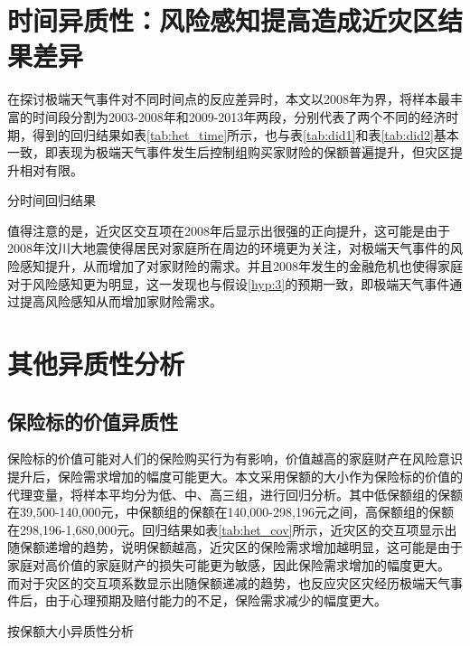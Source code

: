 \section{时间异质性：风险感知提高造成近灾区结果差异}

在探讨极端天气事件对不同时间点的反应差异时，本文以2008年为界，将样本最丰富的时间段分割为2003-2008年和2009-2013年两段，分别代表了两个不同的经济时期，得到的回归结果如表\ref{tab:het_time}所示，也与表\ref{tab:did1}和表\ref{tab:did2}基本一致，即表现为极端天气事件发生后控制组购买家财险的保额普遍提升，但灾区提升相对有限。

\begin{table}[ht]
    \centering
    \renewcommand{\arraystretch}{1}
    \caption{分时间回归结果}\label{tab:het_time}
    
\end{table}

值得注意的是，近灾区交互项在2008年后显示出很强的正向提升，这可能是由于2008年汶川大地震使得居民对家庭所在周边的环境更为关注，对极端天气事件的风险感知提升，从而增加了对家财险的需求。并且2008年发生的金融危机也使得家庭对于风险感知更为明显，这一发现也与假设\ref{hyp:3}的预期一致，即极端天气事件通过提高风险感知从而增加家财险需求。

\section{其他异质性分析}
\subsection{保险标的价值异质性}
保险标的价值可能对人们的保险购买行为有影响，价值越高的家庭财产在风险意识提升后，保险需求增加的幅度可能更大。本文采用保额的大小作为保险标的价值的代理变量，将样本平均分为低、中、高三组，进行回归分析。其中低保额组的保额在39,500-140,000元，中保额组的保额在140,000-298,196元之间，高保额组的保额在298,196-1,680,000元。回归结果如表\ref{tab:het_cov}所示，近灾区的交互项显示出随保额递增的趋势，说明保额越高，近灾区的保险需求增加越明显，这可能是由于家庭对高价值的家庭财产的损失可能更为敏感，因此保险需求增加的幅度更大。
而对于灾区的交互项系数显示出随保额递减的趋势，也反应灾区灾经历极端天气事件后，由于心理预期及赔付能力的不足，保险需求减少的幅度更大。
\begin{table}
    \centering
    \caption{按保额大小异质性分析}\label{tab:het_cov}
    
\end{table}

